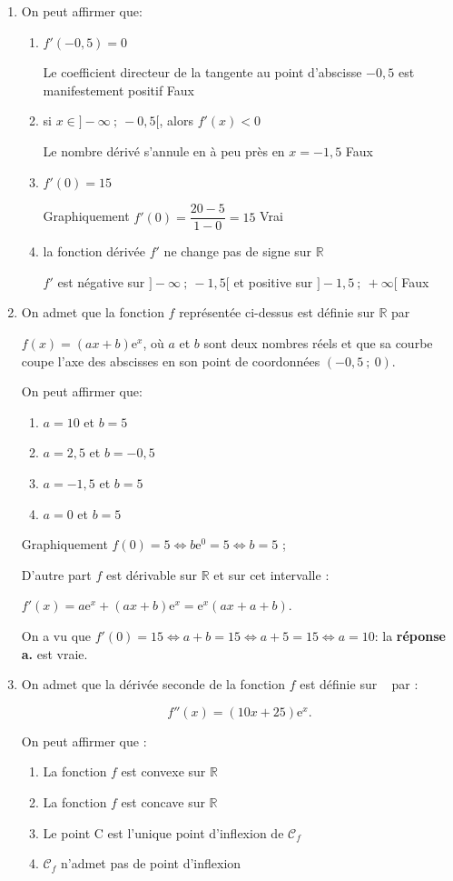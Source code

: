 \documentclass[10pt]{article}
\providecommand{\R}{\mathbb{R}}
\begin{document}
\begin{enumerate}
\item On peut affirmer que:
	\begin{enumerate}
		\item $f'(-0,5) = 0$ 
		
		Le coefficient directeur de la tangente au point d'abscisse $- 0,5$ est manifestement positif \hfill Faux
		\item si $x \in ]- \infty~;~-0,5[$, alors $f'(x) < 0$ 
		
		Le nombre dérivé s'annule en à peu près en $x = -1,5$ \hfill Faux
		\item $f'(0) = 15$ 
		
		Graphiquement $f'(0) = \dfrac{20 - 5}{1 - 0}= 15$ \hfill Vrai
		\item la fonction dérivée $f'$ ne change pas de signe sur $\R$ 
		
		$f'$ est négative sur $]- \infty~;~- 1,5[$ et positive sur $]- 1,5~;~+ \infty[$ \hfill Faux
	\end{enumerate}
\item On admet que la fonction $f$ représentée ci-dessus est définie sur $\R$ par 

$f(x) = (ax + b)\text{e}^x$, où $a$ et $b$ sont deux nombres réels et que sa courbe coupe l'axe des abscisses en son point de coordonnées $(-0,5~;~ 0)$.

On peut affirmer que:
	\begin{enumerate}
		\item $a = 10$ et $b = 5$ 
		\item $a = 2,5$ et $b = -0,5$ 
		\item $a = -1,5$ et $b = 5$ 
		\item $a = 0$ et $b = 5$
	\end{enumerate}
	
Graphiquement $f(0) = 5 \iff b\text{e}^0 = 5 \iff b = 5$ ;

D'autre part $f$ est dérivable sur $\R$ et sur cet intervalle :

$f'(x) = a\text{e}^x + (ax + b)\text{e}^x = \text{e}^x(ax + a + b)$.

On a vu que $f'(0) = 15 \iff a + b = 15 \iff a + 5 = 15 \iff a = 10$:  la  \textbf{réponse a.} est vraie.
\item On admet que la dérivée seconde de la fonction $f$ est définie sur ~ par : 

\[f''(x) = (10x + 25)\text{e}^x.\]

On peut affirmer que :
	\begin{enumerate}
		\item La fonction $f$ est convexe sur $\R$
		\item La fonction $f$ est concave sur $\R$
		\item Le point C est l'unique point d'inflexion de $\mathcal{C}_f$
		\item $\mathcal{C}_f$ n'admet pas de point d'inflexion
	\end{enumerate}
	

\end{enumerate}
\end{document}
